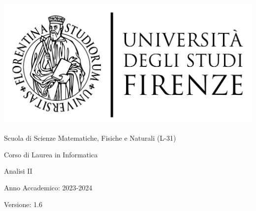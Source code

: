 \documentclass[11pt]{article}
\newcommand{\myDegree}{Corso di Laurea in Informatica}
\newcommand{\myFaculty}{
	Scuola di Scienze Matematiche, Fisiche e Naturali (L{-}31)}
\newcommand{\myTime}{Anno Accademico{:} 2023{-}2024}
\newcommand{\myVersion}{1.6}
\begin{document}
\begin{titlepage}
   \begin{center}
      \hfill
      \vspace{2cm}

      \begingroup
      \large
      \includegraphics[scale=0.15]{images/unifi-logo}

      \myFaculty{}

      \myDegree{}
      \endgroup

      \vspace{5cm}

      \begingroup
      \LARGE
      \color{red} Analisi II
      \endgroup
      \medskip

      \myTime{}

      \vfill

      \begingroup
      \hfill Versione: \myVersion{}
      \endgroup

   \end{center}
\end{titlepage}
\newpage

\tableofcontents
\newpage


\newpage


\newpage


\newpage


\newpage
\end{document}
